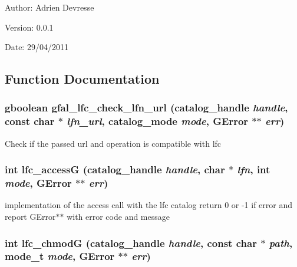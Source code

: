\begin{Desc}
\item[Author:]Adrien Devresse \end{Desc}
\begin{Desc}
\item[Version:]0.0.1 \end{Desc}
\begin{Desc}
\item[Date:]29/04/2011 \end{Desc}


\subsection{Function Documentation}
\subsubsection{\setlength{\rightskip}{0pt plus 5cm}gboolean gfal\_\-lfc\_\-check\_\-lfn\_\-url (catalog\_\-handle {\em handle}, const char $\ast$ {\em lfn\_\-url}, catalog\_\-mode {\em mode}, GError $\ast$$\ast$ {\em err})}\label{gfal__common__lfc_8c_8baa624b528deb15ff4ee61fa9948ac8}


Check if the passed url and operation is compatible with lfc 
\subsubsection{\setlength{\rightskip}{0pt plus 5cm}int lfc\_\-access\-G (catalog\_\-handle {\em handle}, char $\ast$ {\em lfn}, int {\em mode}, GError $\ast$$\ast$ {\em err})}\label{gfal__common__lfc_8c_960f3f01cd2e130cda6dc3513154a954}


implementation of the access call with the lfc catalog return 0 or -1 if error and report GError$\ast$$\ast$ with error code and message 
\subsubsection{\setlength{\rightskip}{0pt plus 5cm}int lfc\_\-chmod\-G (catalog\_\-handle {\em handle}, const char $\ast$ {\em path}, mode\_\-t {\em mode}, GError $\ast$$\ast$ {\em err})}\label{gfal__common__lfc_8c_f40927feaad58de76b5406eb828102a6}


